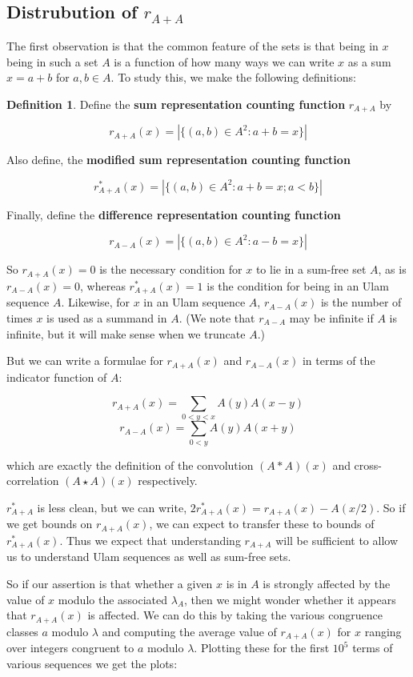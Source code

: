 \documentclass{article}
\theoremstyle{definition}
\newtheorem{definition}{Definition}
\theoremstyle{remark}
\numberwithin{equation}{section}
\begin{document}
\subsection{Distrubution of $r_{A+A}$}

The first observation is that the common feature of the \relevant sets
is that being in $x$ being in such a set $A$ is a function of how many
ways we can write $x$ as a sum $x = a+b$ for $a, b \in A$.  To study
this, we make the following definitions: 

\begin{definition}Define the \textbf{sum representation counting function}
  $r_{A+A}$ by 

  \[r_{A+A}(x) = \left|\{(a,b) \in A^2 : a+b = x\}\right|\]

  Also define, the \textbf{modified sum representation counting function}

  \[r^*_{A+A}(x) = \left|\{(a,b) \in A^2 : a+b = x ; a < b\}\right|\]

  Finally, define the \textbf{difference representation counting
    function}

  \[r_{A-A}(x) = \left|\{(a,b) \in A^2 : a-b = x\}\right|\]
\end{definition} 

So $r_{A+A}(x) = 0$ is the necessary condition for $x$ to lie in a
sum-free set $A$, as is $r_{A-A}(x) = 0$, whereas $r^*_{A+A}(x) = 1$
is the condition for being in an Ulam sequence $A$.  Likewise, for $x$
in an Ulam sequence $A$, $r_{A-A}(x)$ is the number of times $x$ is
used as a summand in $A$.  (We note that $r_{A-A}$ may be infinite if
$A$ is infinite, but it will make sense when we truncate $A$.)

But we can write a formulae for $r_{A+A}(x)$ and $r_{A-A}(x)$ in terms
of the indicator function of $A$:

\[r_{A+A}(x) = \sum_{0 < y < x} A(y)A(x-y)\]
\[r_{A-A}(x) = \sum_{0 < y} A(y)A(x+y)\]

which are exactly the definition of the convolution $(A \ast A)(x)$
and cross-correlation $(A \star A)(x)$ respectively.

$r^*_{A+A}$ is less clean, but we can write,
$2r^*_{A+A}(x) = r_{A+A}(x) - A(x/2)$.  So if we get bounds on
$r_{A+A}(x)$, we can expect to transfer these to bounds of
$r^*_{A+A}(x)$.  Thus we expect that understanding $r_{A+A}$ will be
sufficient to allow us to understand Ulam sequences as well as
sum-free sets.

So if our assertion is that whether a given $x$ is in $A$ is strongly
affected by the value of $x$ modulo the associated $\lambda_A$, then
we might wonder whether it appears that $r_{A+A}(x)$ is affected.  We
can do this by taking the various congruence classes $a$ modulo
$\lambda$ and computing the average value of $r_{A+A}(x)$ for $x$
ranging over integers congruent to $a$ modulo $\lambda$.  Plotting
these for the first $10^5$ terms of various sequences we get the
plots:
\end{document}
